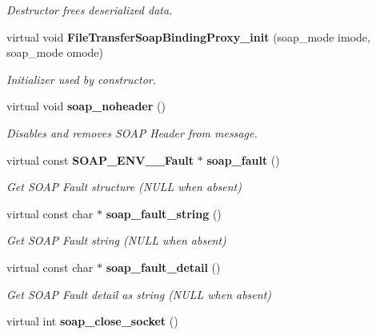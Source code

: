 \begin{DoxyCompactItemize}
\begin{DoxyCompactList}\small\item\em Destructor frees deserialized data. \item\end{DoxyCompactList}\item 
virtual void {\bf FileTransferSoapBindingProxy\_\-init} (soap\_\-mode imode, soap\_\-mode omode)\label{classFileTransferSoapBindingProxy_a19ad46adf3256c3bb390a7568aae9309}

\begin{DoxyCompactList}\small\item\em Initializer used by constructor. \item\end{DoxyCompactList}\item 
virtual void {\bf soap\_\-noheader} ()\label{classFileTransferSoapBindingProxy_aad8ec48d598fc29bfa4387187efc3da8}

\begin{DoxyCompactList}\small\item\em Disables and removes SOAP Header from message. \item\end{DoxyCompactList}\item 
virtual const {\bf SOAP\_\-ENV\_\-\_\-Fault} $\ast$ {\bf soap\_\-fault} ()\label{classFileTransferSoapBindingProxy_af29c64eae217e44a0c5ce1443ff15697}

\begin{DoxyCompactList}\small\item\em Get SOAP Fault structure (NULL when absent) \item\end{DoxyCompactList}\item 
virtual const char $\ast$ {\bf soap\_\-fault\_\-string} ()\label{classFileTransferSoapBindingProxy_a86c9e09a198d62eb5ead5a2a7c2b6967}

\begin{DoxyCompactList}\small\item\em Get SOAP Fault string (NULL when absent) \item\end{DoxyCompactList}\item 
virtual const char $\ast$ {\bf soap\_\-fault\_\-detail} ()\label{classFileTransferSoapBindingProxy_a0da5102ac7bd9cbcb06ed48b843b89d2}

\begin{DoxyCompactList}\small\item\em Get SOAP Fault detail as string (NULL when absent) \item\end{DoxyCompactList}\item 
virtual int {\bf soap\_\-close\_\-socket} ()\label{classFileTransferSoapBindingProxy_a8bd7fc4257c76c60fddf8729f51103a0}


\end{DoxyCompactItemize}
